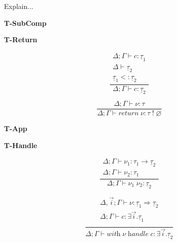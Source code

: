 \documentclass[12pt]{article}
\newcommand\ty[0]{\tau}
\newcommand\tarr[2]{#1 \rightarrow #2}
\newcommand\thandler[2]{#1 \Rightarrow #2}
\newcommand\cty[0]{\underline{\ty}}
\newcommand\aty[2]{#1 \; ! \; #2}
\newcommand\texistss[2]{\exists \overrightarrow{#1} . #2}
\newcommand\val[0]{\nu}
\newcommand\comp[0]{c}
\newcommand\creturn[1]{\textit{return} \; #1}
\newcommand\capp[2]{#1 \; #2}
\newcommand\chandle[2]{\textit{with} \; #1 \; \textit{handle} \; #2}
\newcommand\subty[2]{#1 <: #2}
\begin{document}
Explain...\\
\begin{minipage}{0.5\textwidth}
\textbf{T-SubComp}
\end{minipage}
\begin{minipage}{0.5\textwidth}
\textbf{T-Return}
\end{minipage}
\begin{minipage}{0.5\textwidth}
\[\frac{
	\begin{array}{l}
	\Delta;\Gamma \vdash \comp : \cty_1 \\
	\Delta \vdash \cty_2 \\
	\subty{\cty_1}{\cty_2}
	\end{array}
}{
	\Delta;\Gamma \vdash \comp : \cty_2
}\]
\vspace{10pt}
\end{minipage}
\begin{minipage}{0.5\textwidth}
\[\frac{
	\Delta;\Gamma \vdash \val : \ty
}{
	\Delta;\Gamma \vdash \creturn{\val} : \aty{\ty}{\varnothing}
}\]
\vspace{10pt}
\end{minipage}
\begin{minipage}{0.5\textwidth}
\textbf{T-App}
\end{minipage}
\begin{minipage}{0.5\textwidth}
\textbf{T-Handle}
\end{minipage}
\begin{minipage}{0.5\textwidth}
\[\frac{
	\begin{array}{l}
	\Delta;\Gamma \vdash \val_1 : \tarr{\ty_1}{\cty_2} \\
	\Delta;\Gamma \vdash \val_2 : \ty_1
	\end{array}
}{
	\Delta;\Gamma \vdash \capp{\val_1}{\val_2} : \cty_2
}\]
\vspace{10pt}
\end{minipage}
\begin{minipage}{0.5\textwidth}
\[\frac{
	\begin{array}{l}
	\Delta,\overrightarrow{i};\Gamma \vdash \val : \thandler{\cty_1}{\cty_2} \\
	\Delta;\Gamma \vdash \comp : \texistss{i}{\cty_1} \\
	\end{array}
}{
	\Delta;\Gamma \vdash \chandle{\val}{\comp} : \texistss{i}{\cty_2}
}\]
\vspace{10pt}
\end{minipage}
\\
\end{document}
